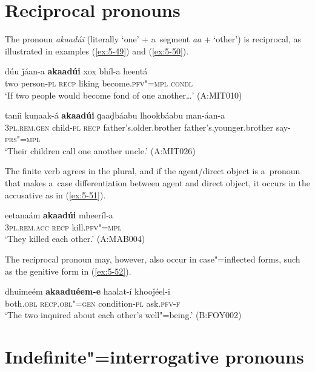 \section{Reciprocal pronouns}
\label{sec:5-6}

The pronoun \textit{akaadúi} (literally `one' + a~segment \textit{aa} + `other') is reciprocal,
as illustrated in examples (\ref{ex:5-49}) and (\ref{ex:5-50}).

\ea 
\label{ex:5-49}
\gll dúu ǰáan-a \textbf{akaadúi} xox bhíl-a heentá\\
two person-\textsc{pl} \textsc{recp} liking become.\textsc{pfv"=mpl} \textsc{condl}\\
\glt `If two people would become fond of one another{\ldots}' (A:MIT010)

\ex
\label{ex:5-50}
\gll taníi kuṇaak-á \textbf{akaadúi} ɡaaḍbáabu lhookbáabu man-áan-a\\
\textsc{3pl.rem.gen} child-\textsc{pl} \textsc{recp} father's.older.brother father's.younger.brother say-\textsc{prs"=mpl} \\
\glt `Their children call one another uncle.' (A:MIT026)
\z

The finite verb agrees in the plural, and if the agent/direct object is a~pronoun that makes a~case differentiation between agent and direct object, it occurs in the accusative as in (\ref{ex:5-51}).
\begin{exe}
\ex
\label{ex:5-51}
\gll eetanaám \textbf{akaadúi} mheeríl-a\\
\textsc{3pl.rem.acc} \textsc{recp } kill.\textsc{pfv"=mpl}\\
\glt `They killed each other.' (A:MAB004)
\end{exe}

The reciprocal pronoun may, however, also occur in case"=inflected forms, such as the genitive form in (\ref{ex:5-52}). 
\begin{exe}
\ex
\label{ex:5-52}
\gll dhuimeém \textbf{akaaduéem-e} haalat-í khooǰéel-i\\
both.\textsc{obl} \textsc{recp.obl"=gen } condition-\textsc{pl} ask.\textsc{pfv-f}\\
\glt `The two inquired about each other's well"=being.' (B:FOY002)
\end{exe}

\section{Indefinite"=interrogative pronouns}
\label{sec:5-7}


